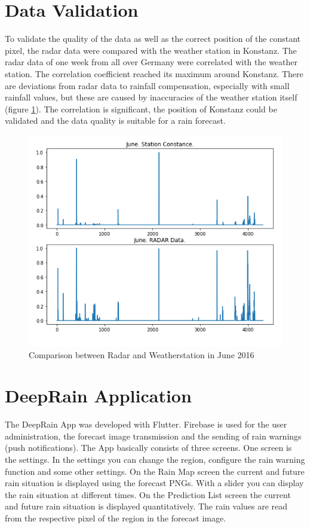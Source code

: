 \documentclass[oneside]{htwg-report}
\begin{document}
\section*{Data Validation}\label{data validation}
\begin{sloppypar}
To validate the quality of the data as well as the correct position of the constant pixel, the radar data were compared with the weather station in Konstanz.
The radar data of one week from all over Germany were correlated with the weather station.
The correlation coefficient reached its maximum around Konstanz.
There are deviations from radar data to rainfall compensation, especially with small rainfall values, but these are caused by inaccuracies of the weather station itself (figure \ref{fig:radar_station_daten_vergleich_June}).
The correlation is significant, the position of Konstanz could be validated and the data quality is suitable for a rain forecast.
\end{sloppypar}

\begin{figure}[ht]
    \centering
    \includegraphics[width=0.8\linewidth,angle=0]{../abb/radar_station_daten_vergleich_June.png}
    \caption[Datenaufbereitung]{Comparison between Radar and Weatherstation in June 2016}
    \label{fig:radar_station_daten_vergleich_June}
\end{figure}

\section*{DeepRain Application}
    \begin{sloppypar}
        The DeepRain App was developed with Flutter. 
        Firebase is used for the user administration, the forecast image transmission and the sending of rain warnings (push notifications). 
        The App basically consists of three screens. One screen is the settings. 
        In the settings you can change the region, configure the rain warning function and some other settings.
        On the Rain Map screen the current and future rain situation is displayed using the forecast PNGs. With a slider you can display the rain situation at different times.
        On the Prediction List screen the current and future rain situation is displayed quantitatively. The rain values are read from the respective pixel of the region in the forecast image.   
    \end{sloppypar}
\end{document}
